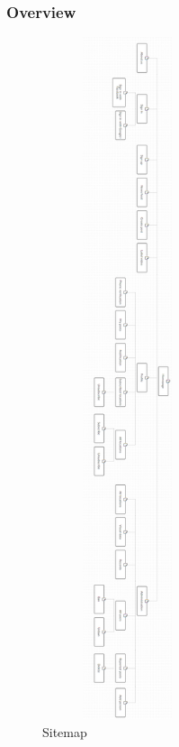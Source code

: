 \subsubsection{Overview}
\begin{center}
    \begin{figure}[H]
    \centering
    \includegraphics[width=5cm,height=20cm]{images/chap4/sitemap.png}
    \caption{Sitemap}
    \end{figure}
\end{center}
